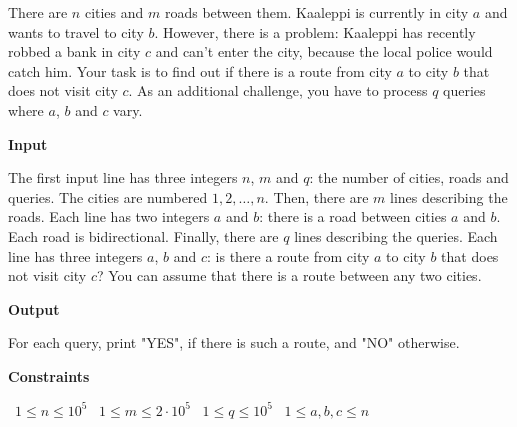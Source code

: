 There are $n$ cities and $m$ roads between them. Kaaleppi is currently in city $a$ and wants to travel to city $b$.
However, there is a problem: Kaaleppi has recently robbed a bank in city $c$ and can't enter the city, because the local police would catch him. Your task is to find out if there is a route from city $a$ to city $b$ that does not visit city $c$.
As an additional challenge, you have to process $q$ queries where $a$, $b$ and $c$ vary.

\vspace{0.3cm}\noindent\textbf{Input}

The first input line has three integers $n$, $m$ and $q$: the number of cities, roads and queries. The cities are numbered $1,2,\dots,n$.
Then, there are $m$ lines describing the roads. Each line has two integers $a$ and $b$: there is a road between cities $a$ and $b$. Each road is bidirectional.
Finally, there are $q$ lines describing the queries. Each line has three integers $a$, $b$ and $c$: is there a route from city $a$ to city $b$ that does not visit city $c$?
You can assume that there is a route between any two cities.

\vspace{0.3cm}\noindent\textbf{Output}

For each query, print "YES", if there is such a route, and "NO" otherwise.

\vspace{0.3cm}\noindent\textbf{Constraints}

\textbullet\ $1 \le n \le 10^5$
\textbullet\ $1 \le m \le 2 \cdot 10^5$
\textbullet\ $1 \le q \le 10^5$
\textbullet\ $1 \le a,b,c \le n$